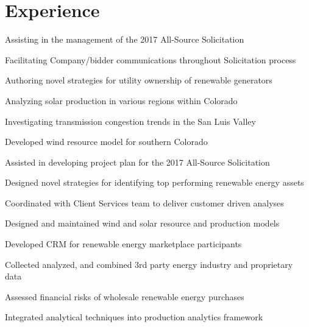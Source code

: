 \documentclass[]{deedy-resume-openfont}
\begin{document}
\begin{minipage}[t]{0.66\textwidth} 


\section{Experience}
\vspace{\topsep} %
\begin{tightemize}
\item Assisting in the management of the 2017 All-Source Solicitation
\item Facilitating Company/bidder communications throughout Solicitation process
\item Authoring novel strategies for utility ownership of renewable generators
\item Analyzing solar production in various regions within Colorado
\item Investigating transmission congestion trends in the San Luis Valley
\item Developed wind resource model for southern Colorado
\item Assisted in developing project plan for the 2017 All-Source Solicitation
\end{tightemize}
\sectionsep

\begin{tightemize}
\item Designed novel strategies for identifying top performing renewable energy assets
\item Coordinated with Client Services team to deliver customer driven analyses
\item Designed and maintained wind and solar resource and production models
\item Developed CRM for renewable energy marketplace participants
\item Collected analyzed, and combined 3rd party energy industry and proprietary data
\item Assessed financial risks of wholesale renewable energy purchases
\item Integrated analytical techniques into production analytics framework
\end{tightemize}
\sectionsep


\end{minipage}
\end{document}
